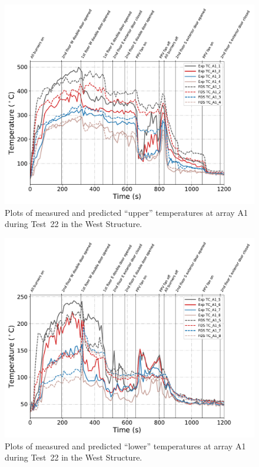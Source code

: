 \begin{figure}[!h]
	\centering
	\includegraphics[width=\columnwidth]{Figures/Plots/Validation/Temperature/Test_22_TC_A1_upper}
	\caption{Plots of measured and predicted ``upper'' temperatures at array A1 during Test~22 in the West Structure.}
	\label{fig:TCA1_upper_data_Test22}
\end{figure}

\begin{figure}[!h]
	\centering
	\includegraphics[width=\columnwidth]{Figures/Plots/Validation/Temperature/Test_22_TC_A1_lower}
	\caption{Plots of measured and predicted ``lower'' temperatures at array A1 during Test~22 in the West Structure.}
	\label{fig:TCA1_lower_data_Test22}
\end{figure}

